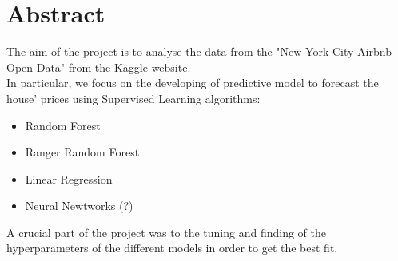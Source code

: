 \documentclass{FR16}
\begin{document}
\maketitle

\tableofcontents
\newpage
\section{Abstract}
The aim of the project is to analyse the data from the "New York City Airbnb Open Data" from the Kaggle website.
\\ In particular, we focus on the developing of predictive model to forecast the house' prices using Supervised Learning algorithms: 
\begin{itemize}
\item Random Forest
\item Ranger Random Forest
\item Linear Regression
\item Neural Newtworks (?)
\end{itemize}
A crucial part of the project was to the tuning and finding of the hyperparameters of the different models in order to get the best fit.

\newpage
\end{document}

